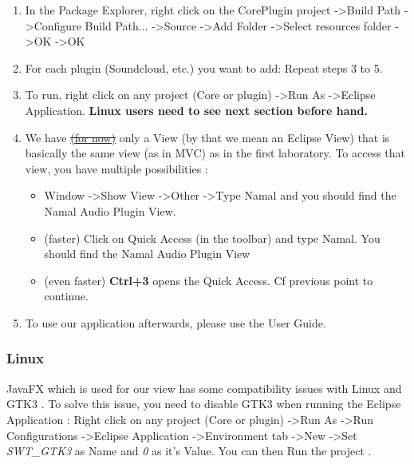 \documentclass{report}
\begin{document}
{\begin{enumerate}
\item In the Package Explorer, right click on the CorePlugin project -\textgreater Build Path -\textgreater Configure Build Path... -\textgreater Source -\textgreater Add Folder -\textgreater Select resources folder -\textgreater OK -\textgreater OK
\item For each plugin (Soundcloud, etc.) you want to add: Repeat steps 3 to 5.
\item To run, right click on any project (Core or plugin) -\textgreater Run As -\textgreater Eclipse Application. \textbf{Linux users need to see next section before hand.}
\item We have \sout{\hyperref[lim::toolbar]{(for now)}} only a View (by that we mean an Eclipse View) that is basically the same view (as in MVC) as in the first laboratory. To access that view, you have multiple possibilities :
\begin{itemize}
\item Window -\textgreater Show View -\textgreater Other -\textgreater Type Namal and you should find the Namal Audio Plugin View.
\item (faster) Click on Quick Access (in the toolbar) and type Namal. You should find the Namal Audio Plugin View
\item (even faster) \textbf{Ctrl+3} opens the Quick Access. Cf previous point to continue.
\end{itemize}
\item To use our application afterwards, please use the User Guide.
\end{enumerate}

\subsubsection{Linux}
JavaFX which is used for our view has some compatibility issues with Linux and GTK3 . To solve this issue, you need to disable GTK3 when running the Eclipse Application : Right click on any project (Core or plugin) -\textgreater Run As -\textgreater Run Configurations -\textgreater Eclipse Application -\textgreater Environment tab -\textgreater New -\textgreater Set \textit{SWT\_GTK3} as Name and \textit{0} as it's Value. You can then Run the project .
}
\end{document}
